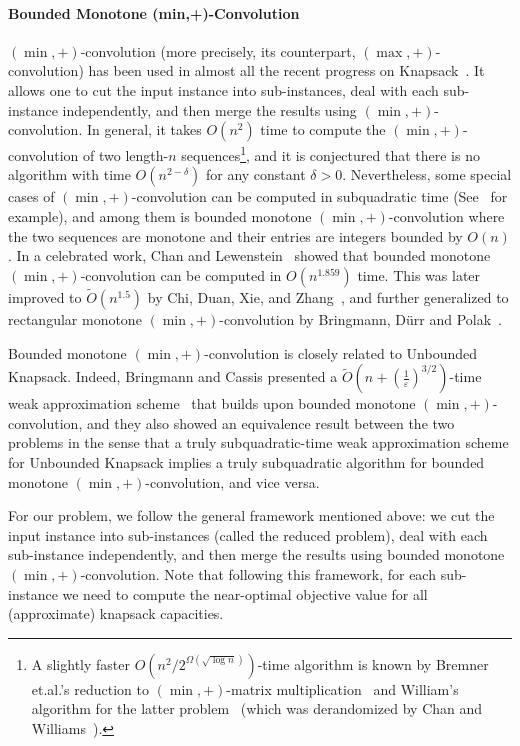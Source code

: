 \documentclass[a4paper,UKenglish,cleveref, autoref, thm-restate, pdfa]{lipics-v2021}
\newcommand{\eps}{\varepsilon}
\begin{document}
\paragraph*{Bounded Monotone (min,+)-Convolution} 
$(\min,+)$-convolution (more precisely, its counterpart, $(\max,+)$-convolution) has been used in almost all the recent progress on Knapsack~\cite{Chan18,Jin19,CLMZ24aSODA,Jin24,Bri24,CLMZ24bSTOCKnapsack,Mao24}. It allows one to cut the input instance into sub-instances, deal with each sub-instance independently, and then merge the results using $(\min,+)$-convolution. In general, it takes $O(n^2)$ time to compute the $(\min,+)$-convolution of two length-$n$ sequences\footnote{A slightly faster $O(n^2/2^{\Omega(\sqrt{\log n})})$-time algorithm is known by Bremner et.al.'s reduction to $(\min,+)$-matrix multiplication~\cite{BCD+14} and William's algorithm for the latter problem~\cite{Wil14} (which was derandomized by Chan and Williams~\cite{CW16}).}, and it is conjectured that there is no algorithm with time $O(n^{2 - \delta})$ for any constant $\delta > 0$. Nevertheless, some special cases of $(\min,+)$-convolution can be computed in subquadratic time (See~\cite{AKM+87,AT19,PRW21,CL15,CDXZ22} for example), and among them is bounded monotone $(\min,+)$-convolution where the two sequences are monotone and their entries are integers bounded by $O(n)$. In a celebrated work, Chan and Lewenstein~\cite{CL15} showed that bounded monotone $(\min,+)$-convolution can be computed in $O(n^{1.859})$ time. This was later improved to $\tilde{O}(n^{1.5})$ by Chi, Duan, Xie, and Zhang~\cite{CDXZ22}, and further generalized to rectangular monotone $(\min,+)$-convolution by Bringmann, D{\"{u}}rr and Polak~\cite{DBLP:conf/esa/BringmannD024}.

Bounded monotone $(\min,+)$-convolution is closely related to Unbounded Knapsack. Indeed, Bringmann and Cassis presented a $\tilde{O}(n+(\frac{1}{\eps})^{3/2})$-time weak approximation scheme~\cite{BC22} that builds upon bounded monotone $(\min,+)$-convolution, and they also showed an equivalence result between the two problems in the sense that a truly subquadratic-time weak approximation scheme for Unbounded Knapsack implies a truly subquadratic algorithm for bounded monotone $(\min,+)$-convolution, and vice versa.



For our problem, we follow the general framework mentioned above: we cut the input instance into sub-instances (called the reduced problem), deal with each sub-instance independently, and then merge the results using bounded monotone $(\min,+)$-convolution. Note that following this framework, for each sub-instance we need to compute the near-optimal objective value for all (approximate) knapsack capacities.
\end{document}
